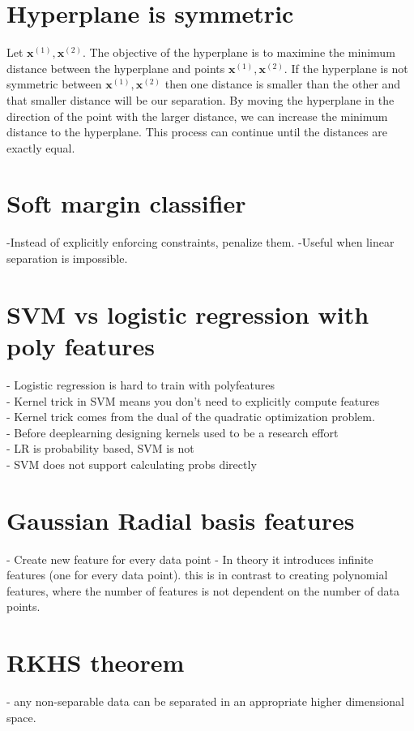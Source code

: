 \documentclass{article}
\begin{document}
\section{Hyperplane is symmetric}
Let $\pmb{x}^{(1)},\pmb{x}^{(2)}$. The objective of the hyperplane is to maximine the minimum distance between the hyperplane and points $\pmb{x}^{(1)},\pmb{x}^{(2)}$. If the hyperplane is not symmetric between $\pmb{x}^{(1)},\pmb{x}^{(2)}$ then one distance is smaller than the other and that smaller distance will be our separation. By moving the hyperplane in the direction of the point with the larger distance, we can increase the minimum distance to the hyperplane. This process can continue until the distances are exactly equal.

\section{Soft margin classifier}
-Instead of explicitly enforcing constraints, penalize them.
-Useful when linear separation is impossible.

\section{SVM vs logistic regression with poly features}
- Logistic regression is hard to train with polyfeatures\\
- Kernel trick in SVM means you don't need to explicitly compute features\\
- Kernel trick comes from the dual of the quadratic optimization problem.\\
- Before deeplearning designing kernels used to be a research effort\\
- LR is probability based, SVM is not\\
- SVM does not support calculating probs directly\\

\section{Gaussian Radial basis features}
- Create new feature for every data point
- In theory it introduces infinite features (one for every data point). this is in contrast to creating polynomial features, where the number of features is not dependent on the number of data points.

\section{RKHS theorem}
- any non-separable data can be separated in an appropriate higher dimensional space.
\end{document}
